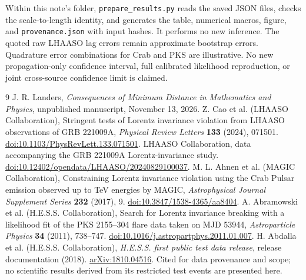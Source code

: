 \documentclass[11pt]{article}
\begin{document}
Within this note's folder, \texttt{prepare\_results.py} reads the saved JSON files, checks the scale-to-length identity, and generates the table, numerical macros, figure, and \texttt{provenance.json} with input hashes. It performs no new inference. The quoted raw LHAASO lag errors remain approximate bootstrap errors. Quadrature error combinations for Crab and PKS are illustrative. No new propagation-only confidence interval, full calibrated likelihood reproduction, or joint cross-source confidence limit is claimed.

\begin{thebibliography}{9}
\small
{} J. R. Landers, \emph{Consequences of Minimum Distance in Mathematics and Physics}, unpublished manuscript, November 13, 2026.
 Z. Cao et al. (LHAASO Collaboration), Stringent tests of Lorentz invariance violation from LHAASO observations of GRB 221009A, \emph{Physical Review Letters} \textbf{133} (2024), 071501. \href{https://doi.org/10.1103/PhysRevLett.133.071501}{doi:10.1103/PhysRevLett.133.071501}.
 LHAASO Collaboration, data accompanying the GRB 221009A Lorentz-invariance study. \href{https://doi.org/10.12402/opendata/LHAASO/20240829100037}{doi:10.12402/opendata/LHAASO/20240829100037}.
 M. L. Ahnen et al. (MAGIC Collaboration), Constraining Lorentz invariance violation using the Crab Pulsar emission observed up to TeV energies by MAGIC, \emph{Astrophysical Journal Supplement Series} \textbf{232} (2017), 9. \href{https://doi.org/10.3847/1538-4365/aa8404}{doi:10.3847/1538-4365/aa8404}.
 A. Abramowski et al. (H.E.S.S. Collaboration), Search for Lorentz invariance breaking with a likelihood fit of the PKS 2155--304 flare data taken on MJD 53944, \emph{Astroparticle Physics} \textbf{34} (2011), 738--747. \href{https://doi.org/10.1016/j.astropartphys.2011.01.007}{doi:10.1016/j.astropartphys.2011.01.007}.
 H. Abdalla et al. (H.E.S.S. Collaboration), \emph{H.E.S.S. first public test data release}, release documentation (2018). \href{https://arxiv.org/abs/1810.04516}{arXiv:1810.04516}. Cited for data provenance and scope; no scientific results derived from its restricted test events are presented here.
\end{thebibliography}
\end{document}

